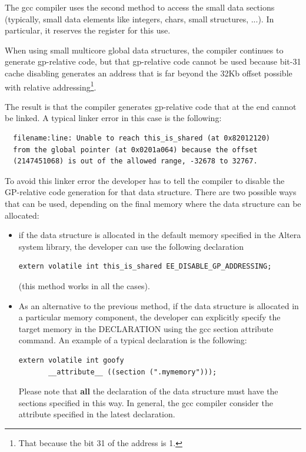 The gcc compiler uses the second method to access the small data
sections (typically, small data elements like integers, chars, small
structures, ...). In particular, it reserves the  register for this
use.

When using small multicore global data structures, the compiler
continues to generate gp-relative code, but that gp-relative code
cannot be used because bit-31 cache disabling generates an address
that is far beyond the 32Kb offset possible with relative
addressing\footnote{That because the bit 31 of the address is 1.}.

The result is that the compiler generates gp-relative code that at the
end cannot be linked. A typical linker error in this case is the
following:

\begin{lstlisting}
  filename:line: Unable to reach this_is_shared (at 0x82012120) 
  from the global pointer (at 0x0201a064) because the offset 
  (2147451068) is out of the allowed range, -32678 to 32767.
\end{lstlisting}

To avoid this linker error the developer has to tell the compiler to
disable the GP-relative code generation for that data structure. There
are two possible ways that can be used, depending on the final memory
where the data structure can be allocated:

\begin{itemize}
\item if the data structure is allocated in the default memory
  specified in the Altera system library, the developer can use the
  following declaration

  \begin{lstlisting}
extern volatile int this_is_shared EE_DISABLE_GP_ADDRESSING;
  \end{lstlisting}
  (this method works in all the cases).


\item As an alternative to the previous method, if the data structure is
  allocated in a particular memory component, the developer can
  explicitly specify the target memory in the DECLARATION using the
  gcc section attribute command. An example of a typical declaration
  is the following:

  \begin{lstlisting}
extern volatile int goofy 
       __attribute__ ((section (".mymemory")));
  \end{lstlisting}
  Please note that {\bf all} the declaration of the data structure
  must have the sections specified in this way. In general, the gcc
  compiler consider the attribute specified in the latest declaration.
\end{itemize}








